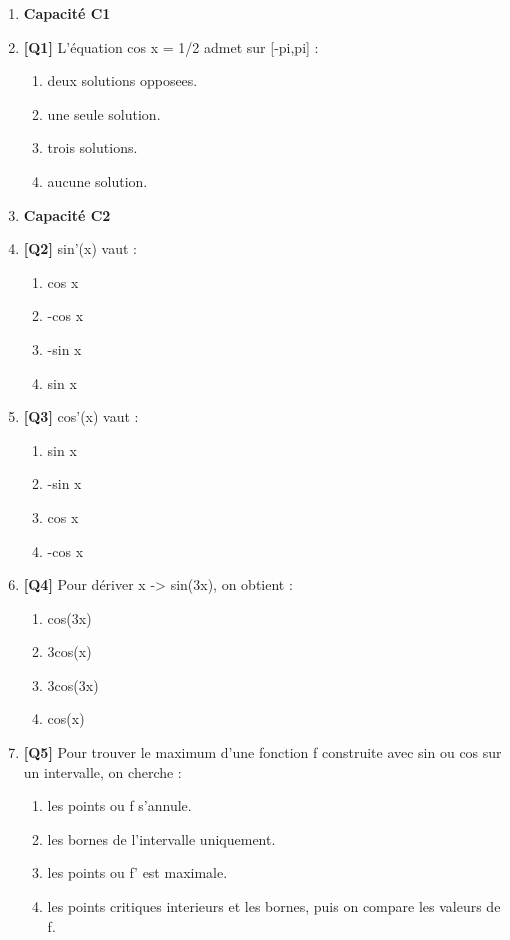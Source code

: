\begin{enumerate}

\item[] \textbf{Capacité C1}

\item \textbf{[Q1]} L'équation cos x = 1/2 admet sur [-pi,pi] :
  \begin{enumerate}[label=\Alph*.]
    \item deux solutions opposees.
    \item une seule solution.
    \item trois solutions.
    \item aucune solution.
  \end{enumerate}

\item[] \textbf{Capacité C2}

\item \textbf{[Q2]} sin'(x) vaut :
  \begin{enumerate}[label=\Alph*.]
    \item cos x
    \item -cos x
    \item -sin x
    \item sin x
  \end{enumerate}

\item \textbf{[Q3]} cos'(x) vaut :
  \begin{enumerate}[label=\Alph*.]
    \item sin x
    \item -sin x
    \item cos x
    \item -cos x
  \end{enumerate}

\item \textbf{[Q4]} Pour dériver x -> sin(3x), on obtient :
  \begin{enumerate}[label=\Alph*.]
    \item cos(3x)
    \item 3cos(x)
    \item 3cos(3x)
    \item cos(x)
  \end{enumerate}

\item \textbf{[Q5]} Pour trouver le maximum d'une fonction f construite avec sin ou cos sur un intervalle, on cherche :
  \begin{enumerate}[label=\Alph*.]
    \item les points ou f s'annule.
    \item les bornes de l'intervalle uniquement.
    \item les points ou f' est maximale.
    \item les points critiques interieurs et les bornes, puis on compare les valeurs de f.
  \end{enumerate}

\end{enumerate}

